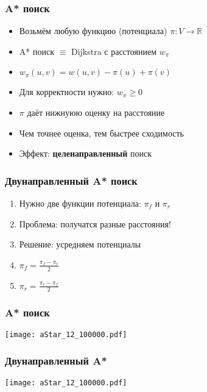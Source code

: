 \documentclass{beamer}
\begin{document}

\begin{frame}
\frametitle{A* поиск}
\begin{itemize}	
  \item Возьмём любую функцию (потенциала) $\pi \colon V \to \mathbb{R}$
  \item A* поиск $\equiv$ Dijkstra с расстоянием $w_\pi$
  \item $w_{\pi}(u,v) = w(u, v) - \pi(u) + \pi(v)$
  \item Для корректности нужно: $w_{\pi} \geq 0$
  \item $\pi$ даёт нижнуюю оценку на расстояние
  \item Чем точнее оценка, тем быстрее сходимость
  \item Эффект: \textbf{целенаправленный} поиск
\end{itemize}
\end{frame}


\begin{frame}
\frametitle{Двунаправленный A* поиск}
\begin{enumerate}

\item Нужно две функции потенциала: $\pi_f$ и $\pi_r$
\item Проблема: получатся разные расстояния!
\item Решение: усредняем потенциалы 
\item $\pi_f = \frac{\pi_f - \pi_r}{2}$
\item $\pi_r = \frac{\pi_r - \pi_f}{2}$
\end{enumerate}

\end{frame}


\begin{frame}
\frametitle{A* поиск}
\texttt{[image: aStar\_12\_100000.pdf]}
\end{frame}


\begin{frame}
\frametitle{Двунаправленный A*}
\texttt{[image: aStar\_12\_100000.pdf]}
\end{frame}

\end{document}
